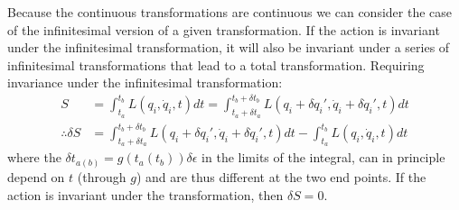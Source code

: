 Because the continuous transformations are continuous we can consider the case of the infinitesimal version of a given transformation. If the action is invariant under the infinitesimal transformation, it will also be invariant under a series of infinitesimal transformations that lead to a total transformation. Requiring invariance under the infinitesimal transformation:
\begin{align}
S&=\int_{t_a}^{t_b}L(q_i,\dot{q}_i,t)dt=\int_{t_a+\delta t_a}^{t_b+\delta t_b} L(q_i+\delta q_i', \dot{q}_i+\delta\dot{q}_i',t)dt\nonumber\\
\therefore \delta S&=\int_{t_a+\delta t_a}^{t_b+\delta t_b} L(q_i+\delta q_i', \dot{q}_i+\delta\dot{q}_i',t)dt-\int_{t_a}^{t_b}L(q_i,\dot{q}_i,t)dt
\end{align}
where the $\delta t_{a(b)}=g(t_a(t_b)) \delta \epsilon$ in the limits of the integral, can in principle depend on $t$ (through $g$) and are thus different at the two end points. If the action is invariant under the transformation, then $\delta S=0$.

